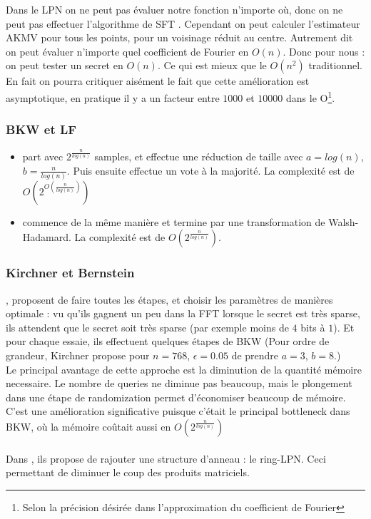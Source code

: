 \documentclass{article}		%
\theoremstyle{definition}
\theoremstyle{plain}
\begin{document}
Dans le LPN on ne peut pas évaluer notre fonction n'importe où, donc on
ne peut pas effectuer l'algorithme de SFT \cite{Akavia}. Cependant on peut calculer
l'estimateur AKMV pour tous les points, pour un voisinage réduit au
centre.  Autrement dit on peut évaluer n'importe quel coefficient de
Fourier en $O(n)$. Donc pour nous : on peut tester un secret en $O(n)$.
Ce qui est mieux que le $O(n^2)$ traditionnel. \\
En fait on pourra critiquer aisément le fait que cette amélioration est
asymptotique, en pratique il y a un facteur entre $1000$ et $10000$ dans
le O\footnote{Selon la précision désirée dans l'approximation du
coefficient de Fourier}. 
\subsubsection{BKW et LF}
\begin{itemize}
\item \cite{BKW} part avec $2^\frac{n}{log(n)}$ samples, et effectue une
réduction de taille avec $a=log(n)$, $b = \frac{n}{log(n)}$.
 Puis ensuite effectue un vote à la majorité. La complexité
est de $O(2^{O(\frac {n} {log(n)})})$   
\item \cite{LF} commence de la même manière et termine par une
transformation de Walsh-Hadamard. La complexité est de
$O(2^\frac{n}{log(n)})$.
\end{itemize}
\subsubsection{Kirchner et Bernstein}
\cite{Bernstein}, \cite{Kirchner} proposent de faire toutes les étapes, et
choisir les paramètres de manières optimale : vu qu'ils gagnent un peu
dans la FFT lorsque le secret est très sparse, ils attendent que le
secret soit très sparse (par exemple moins de $4$ bits à $1$). Et pour
chaque essaie, ils effectuent quelques étapes de BKW (Pour ordre de
grandeur, Kirchner propose
pour $n=768$, $\epsilon=0.05$ de prendre $a=3$, $b=8$.)
\\Le principal avantage de cette approche est la diminution de la
quantité mémoire necessaire. Le nombre de queries ne diminue pas
beaucoup, mais le plongement dans une étape de randomization permet
d'économiser beaucoup de mémoire. C'est une amélioration significative
puisque c'était le principal bottleneck dans BKW, où la mémoire coûtait
aussi en $O(2^\frac{n}{log(n)})$ 
\\\\
Dans \cite{Bernstein}, ils propose de rajouter une structure
d'anneau : le ring-LPN. Ceci permettant de diminuer le coup des produits
matriciels.  
\end{document}
